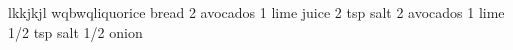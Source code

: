 lkkjkjl
wqbwqliquorice
bread
2 avocados 
1 lime juice
2 tsp salt
2 avocados 
1 lime
1/2 tsp salt
1/2 onion

